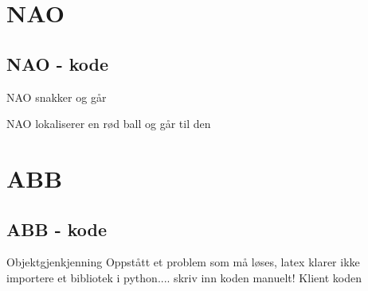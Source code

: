 \section{NAO}
\subsection{NAO - kode}
NAO snakker og går

NAO lokaliserer en rød ball og går til den


\section{ABB}
\subsection{ABB - kode}
Objektgjenkjenning
Oppstått et problem som må løses, latex klarer ikke importere et bibliotek i python.... skriv inn koden manuelt!
%
Klient koden
%